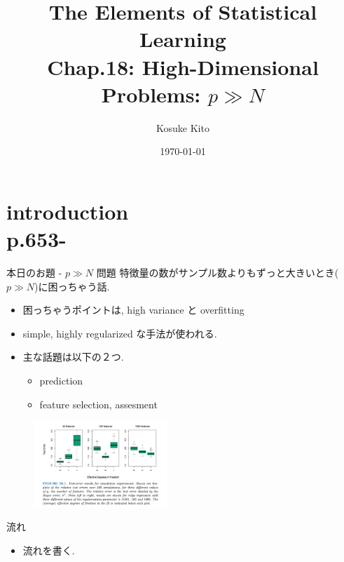 \documentclass[dvipdfmx,8pt]{beamer}
\title{The Elements of Statistical Learning\\Chap.18: High-Dimensional Problems: $p \gg N$}
\date{\today}
\author{Kosuke Kito}
\begin{document}
  \maketitle
  \section{introduction\\p.653-}
  \begin{frame}{本日のお題 - $p \gg N$ 問題}
    特徴量の数がサンプル数よりもずっと大きいとき($p \gg N$)に困っちゃう話.
    \begin{itemize}
      \item 困っちゃうポイントは, high variance と overfitting
      \item simple, highly regularized な手法が使われる.
      \item 主な話題は以下の２つ.
      \begin{itemize}
        \item prediction
        \item feature selection, assesment
      \end{itemize}
    \end{itemize}
    \begin{figure}[htb]
      \centering
      \includegraphics[width=5cm]{./images/test-error-in-high-demension.png}
    \end{figure}
  \end{frame}
  \begin{frame}{流れ}
    \begin{itemize}
      \item 流れを書く.
    \end{itemize}
  \end{frame}
\end{document}
